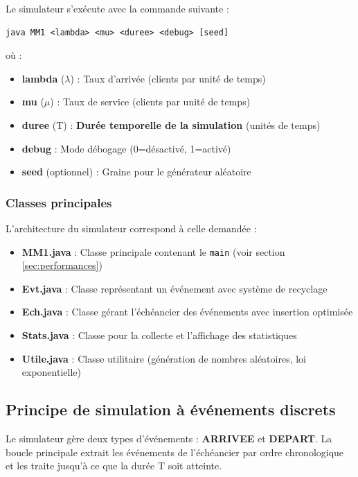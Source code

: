 \documentclass[12pt,a4paper]{article}
\begin{document}
Le simulateur s'exécute avec la commande suivante :
\begin{verbatim}
java MM1 <lambda> <mu> <duree> <debug> [seed]
\end{verbatim}

où :
\begin{itemize}
    \item \textbf{lambda} ($\lambda$) : Taux d'arrivée (clients par unité de temps)
    \item \textbf{mu} ($\mu$) : Taux de service (clients par unité de temps)
    \item \textbf{duree} (T) : \textbf{Durée temporelle de la simulation} (unités de temps)
    \item \textbf{debug} : Mode débogage (0=désactivé, 1=activé)
    \item \textbf{seed} (optionnel) : Graine pour le générateur aléatoire
\end{itemize}

\subsubsection{Classes principales}
L'architecture du simulateur correspond à celle demandée :
\begin{itemize}
    \item \textbf{MM1.java} : Classe principale contenant le \texttt{main} (voir section \ref{sec:performances})
    \item \textbf{Evt.java} : Classe représentant un événement avec système de recyclage
    \item \textbf{Ech.java} : Classe gérant l'échéancier des événements avec insertion optimisée
    \item \textbf{Stats.java} : Classe pour la collecte et l'affichage des statistiques
    \item \textbf{Utile.java} : Classe utilitaire (génération de nombres aléatoires, loi exponentielle)
\end{itemize}

\subsection{Principe de simulation à événements discrets}

Le simulateur gère deux types d'événements : \textbf{ARRIVEE} et \textbf{DEPART}. La boucle principale extrait les événements de l'échéancier par ordre chronologique et les traite jusqu'à ce que la durée T soit atteinte.
\end{document}
